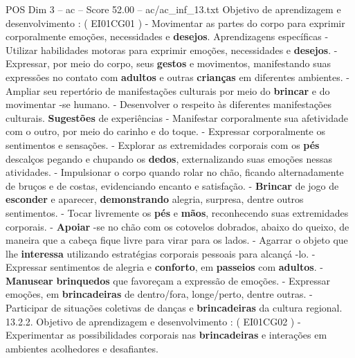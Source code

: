 \begin{textsample}{POS Dim 3 – ac – Score 52.00 – ac/ac\_inf\_13.txt}
Objetivo de aprendizagem e desenvolvimento : ( EI01CG01 ) - Movimentar as partes do corpo para exprimir corporalmente emoções, necessidades e \textbf{desejos}.
Aprendizagens específicas - Utilizar habilidades motoras para exprimir emoções, necessidades e \textbf{desejos}. - Expressar, por meio do corpo, seus \textbf{gestos} e movimentos, manifestando suas expressões no contato com \textbf{adultos} e outras \textbf{crianças} em diferentes ambientes. - Ampliar seu repertório de manifestações culturais por meio do \textbf{brincar} e do movimentar -se humano. - Desenvolver o respeito às diferentes manifestações culturais. \textbf{Sugestões} de experiências - Manifestar corporalmente sua afetividade com o outro, por meio do carinho e do toque. - Expressar corporalmente os sentimentos e sensações. - Explorar as extremidades corporais com os \textbf{pés} descalços pegando e chupando os \textbf{dedos}, externalizando suas emoções nessas atividades. - Impulsionar o corpo quando rolar no chão, ficando alternadamente de bruços e de costas, evidenciando encanto e satisfação. - \textbf{Brincar} de jogo de \textbf{esconder} e aparecer, \textbf{demonstrando} alegria, surpresa, dentre outros sentimentos. - Tocar livremente os \textbf{pés} e \textbf{mãos}, reconhecendo suas extremidades corporais. - \textbf{Apoiar} -se no chão com os cotovelos dobrados, abaixo do queixo, de maneira que a cabeça fique livre para virar para os lados. - Agarrar o objeto que lhe \textbf{interessa} utilizando estratégias corporais pessoais para alcançá -lo. - Expressar sentimentos de alegria e \textbf{conforto}, em \textbf{passeios} com \textbf{adultos}. - \textbf{Manusear} \textbf{brinquedos} que favoreçam a expressão de emoções. - Expressar emoções, em \textbf{brincadeiras} de dentro/fora, longe/perto, dentre outras. - Participar de situações coletivas de danças e \textbf{brincadeiras} da cultura regional. 13.2.2.
Objetivo de aprendizagem e desenvolvimento : ( EI01CG02 ) - Experimentar as possibilidades corporais nas \textbf{brincadeiras} e interações em ambientes acolhedores e desafiantes.

\end{textsample}
